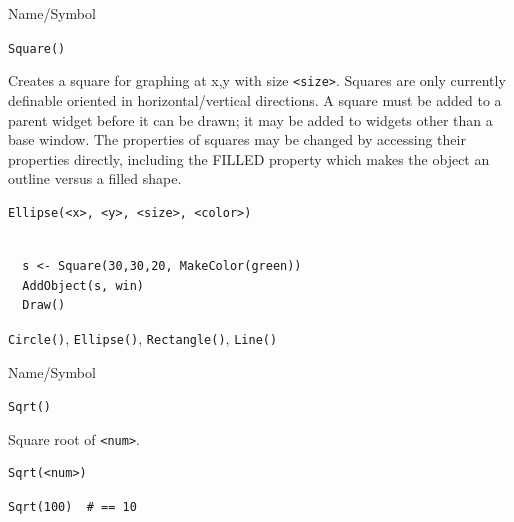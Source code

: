 \begin{desc}{Name/Symbol}
\item[Name/Symbol]	\verb+Square()+
  
\item[Description]	Creates a square for graphing at x,y with size
  \verb+<size>+. Squares are only currently definable oriented in
  horizontal/vertical directions.  A square  must be added
  to a parent widget before it can be drawn; it may be added to
  widgets other than a base window.  The properties of squares may be
  changed by accessing their properties directly, including the FILLED
  property which makes the object an outline versus a filled shape.

\item[Usage]
\begin{verbatim}
Ellipse(<x>, <y>, <size>, <color>)
\end{verbatim}

\item[Example]	
\begin{verbatim}
  
  s <- Square(30,30,20, MakeColor(green))
  AddObject(s, win)
  Draw()

\end{verbatim}
\item[See Also]	 \verb+Circle()+, \verb+Ellipse()+, \verb+Rectangle()+, \verb+Line()+
\end{desc}


\begin{desc}{Name/Symbol}
\item[Name/Symbol]  	\verb+Sqrt()+ 

\item[Description]  	Square root of \verb+<num>+.

\item[Usage]        	
\begin{verbatim}
Sqrt(<num>)
\end{verbatim}

\item[Example]
\begin{verbatim}
Sqrt(100)  # == 10
\end{verbatim}

\item[See Also]	
\end{desc}


